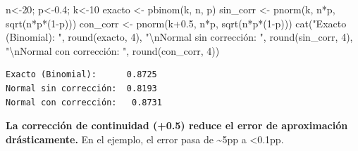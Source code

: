 \documentclass[
  letterpaper,
  DIV=11,
  numbers=noendperiod]{scrartcl}
\newenvironment{Shaded}{\begin{snugshade}}{\end{snugshade}}
\newcommand{\DecValTok}[1]{\textcolor[rgb]{0.68,0.00,0.00}{#1}}
\newcommand{\FloatTok}[1]{\textcolor[rgb]{0.68,0.00,0.00}{#1}}
\newcommand{\FunctionTok}[1]{\textcolor[rgb]{0.28,0.35,0.67}{#1}}
\newcommand{\NormalTok}[1]{\textcolor[rgb]{0.00,0.23,0.31}{#1}}
\newcommand{\OtherTok}[1]{\textcolor[rgb]{0.00,0.23,0.31}{#1}}
\newcommand{\SpecialCharTok}[1]{\textcolor[rgb]{0.37,0.37,0.37}{#1}}
\newcommand{\StringTok}[1]{\textcolor[rgb]{0.13,0.47,0.30}{#1}}
\begin{document}
\begin{Shaded}
\begin{Highlighting}[]
\NormalTok{n}\OtherTok{\textless{}{-}}\DecValTok{20}\NormalTok{; p}\OtherTok{\textless{}{-}}\FloatTok{0.4}\NormalTok{; k}\OtherTok{\textless{}{-}}\DecValTok{10}
\NormalTok{exacto }\OtherTok{\textless{}{-}} \FunctionTok{pbinom}\NormalTok{(k, n, p)}
\NormalTok{sin\_corr }\OtherTok{\textless{}{-}} \FunctionTok{pnorm}\NormalTok{(k, n}\SpecialCharTok{*}\NormalTok{p, }\FunctionTok{sqrt}\NormalTok{(n}\SpecialCharTok{*}\NormalTok{p}\SpecialCharTok{*}\NormalTok{(}\DecValTok{1}\SpecialCharTok{{-}}\NormalTok{p)))}
\NormalTok{con\_corr }\OtherTok{\textless{}{-}} \FunctionTok{pnorm}\NormalTok{(k}\FloatTok{+0.5}\NormalTok{, n}\SpecialCharTok{*}\NormalTok{p, }\FunctionTok{sqrt}\NormalTok{(n}\SpecialCharTok{*}\NormalTok{p}\SpecialCharTok{*}\NormalTok{(}\DecValTok{1}\SpecialCharTok{{-}}\NormalTok{p)))}
\FunctionTok{cat}\NormalTok{(}\StringTok{"Exacto (Binomial):     "}\NormalTok{, }\FunctionTok{round}\NormalTok{(exacto, }\DecValTok{4}\NormalTok{),}
    \StringTok{"}\SpecialCharTok{\textbackslash{}n}\StringTok{Normal sin corrección: "}\NormalTok{, }\FunctionTok{round}\NormalTok{(sin\_corr, }\DecValTok{4}\NormalTok{),}
    \StringTok{"}\SpecialCharTok{\textbackslash{}n}\StringTok{Normal con corrección:  "}\NormalTok{, }\FunctionTok{round}\NormalTok{(con\_corr, }\DecValTok{4}\NormalTok{))}
\end{Highlighting}
\end{Shaded}

\begin{verbatim}
Exacto (Binomial):      0.8725 
Normal sin corrección:  0.8193 
Normal con corrección:   0.8731
\end{verbatim}

\begin{tcolorbox}[enhanced jigsaw, arc=.35mm, bottomrule=.15mm, bottomtitle=1mm, breakable, colback=white, colbacktitle=quarto-callout-tip-color!10!white, colframe=quarto-callout-tip-color-frame, coltitle=black, left=2mm, leftrule=.75mm, opacityback=0, opacitybacktitle=0.6, rightrule=.15mm, title=\textcolor{quarto-callout-tip-color}{\faLightbulb}\hspace{0.5em}{Tip}, titlerule=0mm, toprule=.15mm, toptitle=1mm]

\textbf{La corrección de continuidad (+0.5) reduce el error de
aproximación drásticamente.} En el ejemplo, el error pasa de
\textasciitilde5pp a \textless0.1pp.

\end{tcolorbox}
\end{document}
